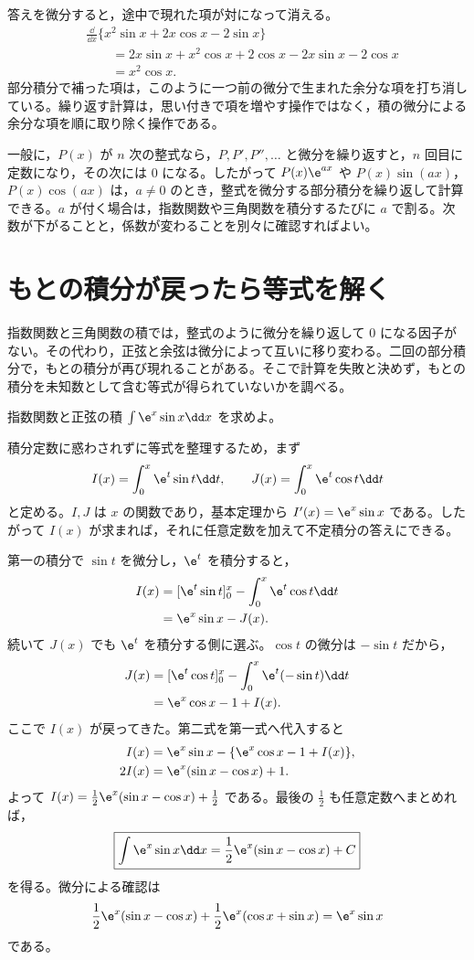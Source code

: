 答えを微分すると，途中で現れた項が対になって消える。
\[
\begin{aligned}
 &\frac{\dd}{\dd x}
  \{x^2\sin x+2x\cos x-2\sin x\}\\
 &\qquad=2x\sin x+x^2\cos x
       +2\cos x-2x\sin x-2\cos x\\
 &\qquad=x^2\cos x.
\end{aligned}
\]
部分積分で補った項は，このように一つ前の微分で生まれた余分な項を打ち消している。繰り返す計算は，思い付きで項を増やす操作ではなく，積の微分による余分な項を順に取り除く操作である。

一般に，$P(x)$ が $n$ 次の整式なら，$P,P',P'',\ldots$ と微分を繰り返すと，$n$ 回目に定数になり，その次には $0$ になる。したがって $P(x)\e^{ax}$ や $P(x)\sin(ax)$，$P(x)\cos(ax)$ は，$a\ne0$ のとき，整式を微分する部分積分を繰り返して計算できる。$a$ が付く場合は，指数関数や三角関数を積分するたびに $a$ で割る。次数が下がることと，係数が変わることを別々に確認すればよい。

\section{もとの積分が戻ったら等式を解く}\label{節:部分積分の循環}

指数関数と三角関数の積では，整式のように微分を繰り返して $0$ になる因子がない。その代わり，正弦と余弦は微分によって互いに移り変わる。二回の部分積分で，もとの積分が再び現れることがある。そこで計算を失敗と決めず，もとの積分を未知数として含む等式が得られていないかを調べる。

\begin{example}{指数関数と正弦の積}
$\int\e^x\sin x\dd x$ を求めよ。
\end{example}

積分定数に惑わされずに等式を整理するため，まず
\[
 I(x)=\int_0^x\e^t\sin t\dd t,\qquad
 J(x)=\int_0^x\e^t\cos t\dd t
\]
と定める。$I,J$ は $x$ の関数であり，基本定理から $I'(x)=\e^x\sin x$ である。したがって $I(x)$ が求まれば，それに任意定数を加えて不定積分の答えにできる。

第一の積分で $\sin t$ を微分し，$\e^t$ を積分すると，
\[
\begin{aligned}
 I(x)
 &=[\e^t\sin t]_0^x-\int_0^x\e^t\cos t\dd t\\
 &=\e^x\sin x-J(x).
\end{aligned}
\]
続いて $J(x)$ でも $\e^t$ を積分する側に選ぶ。$\cos t$ の微分は $-\sin t$ だから，
\[
\begin{aligned}
 J(x)
 &=[\e^t\cos t]_0^x-\int_0^x\e^t(-\sin t)\dd t\\
 &=\e^x\cos x-1+I(x).
\end{aligned}
\]
ここで $I(x)$ が戻ってきた。第二式を第一式へ代入すると
\[
\begin{aligned}
 I(x)
 &=\e^x\sin x-\{\e^x\cos x-1+I(x)\},\\
 2I(x)&=\e^x(\sin x-\cos x)+1.
\end{aligned}
\]
よって $I(x)=\frac12\e^x(\sin x-\cos x)+\frac12$ である。最後の $\frac12$ も任意定数へまとめれば，
\[
 \boxed{\int\e^x\sin x\dd x
 =\frac12\e^x(\sin x-\cos x)+C}
\]
を得る。微分による確認は
\[
 \frac12\e^x(\sin x-\cos x)
 +\frac12\e^x(\cos x+\sin x)
 =\e^x\sin x
\]
である。

